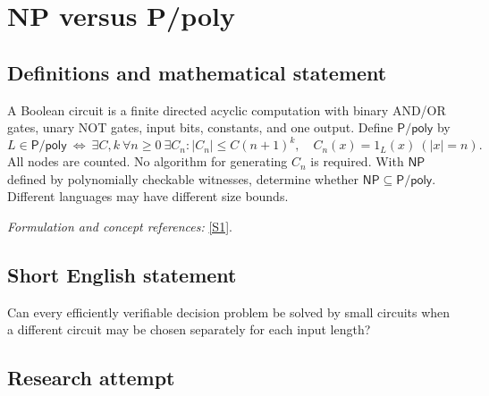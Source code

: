 \documentclass[11pt,a4paper]{article}
\newcommand{\sref}[2]{\hyperlink{source:#1:#2}{[S#2]}}
\newif\ifshowcatalogue
\newcommand{\cataloguescope}[1]{\ifshowcatalogue
 \paragraph{Exact scope in the supplied catalogue.}
 \begin{quote}\small #1\end{quote}\fi}
\begin{document}
\setcounter{section}{0}
\clearpage
\section*{\texorpdfstring{NP versus P/poly}{NP versus P/poly}}\label{statement}
\subsection{Definitions and mathematical statement}
A Boolean circuit is a finite directed acyclic computation with binary AND/OR gates, unary NOT gates, input bits, constants, and one output. Define $\mathsf{P/poly}$ by
\[
 L\in\mathsf{P/poly}\ \Longleftrightarrow\ \exists C,k\ \forall n\ge0\ \exists C_n:
 |C_n|\le C(n+1)^k,\quad C_n(x)=1_L(x)\ (|x|=n).
\]
All nodes are counted. No algorithm for generating $C_n$ is required. With $\mathsf{NP}$ defined by polynomially checkable witnesses, determine whether $\mathsf{NP}\subseteq\mathsf{P/poly}$. Different languages may have different size bounds.
\par\smallskip\textit{Formulation and concept references:} \sref{statement}{1}.
\cataloguescope{Determine the truth of NP subseteq P/poly. Here NP consists of languages over finite binary strings accepted by nondeterministic Turing machines in polynomial time. P/poly consists of languages L for which there exist constants C>=1 and integer k>=1 and Boolean circuits C\_n for all n>=0, of size at most C(n+1)\textasciicircum{}k, deciding membership in L on every length-n input. Circuits are finite acyclic single-output circuits with fan-in-two AND/OR, fan-in-one NOT, input bits and hardwired constants0/1; count all nodes. Each language has its own bound and circuit family, with no uniform generation requirement.}
\subsection{Short English statement}
Can every efficiently verifiable decision problem be solved by small circuits when a different circuit may be chosen separately for each input length?
\subsection{Research attempt}
\end{document}
